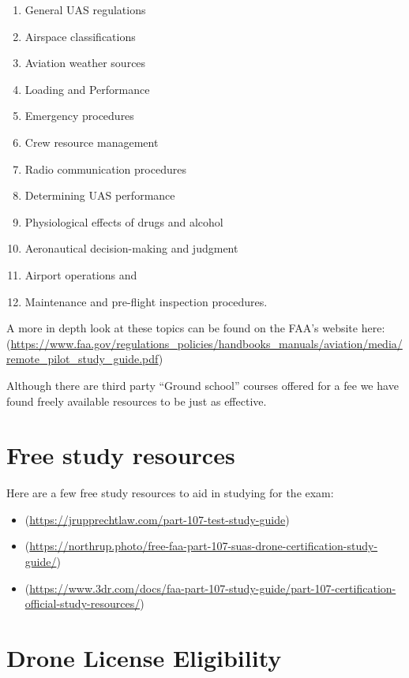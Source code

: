 \documentclass[
]{book}
\providecommand{\tightlist}{%
  \setlength{\itemsep}{0pt}\setlength{\parskip}{0pt}}
\begin{document}
\begin{enumerate}
\def\labelenumi{\arabic{enumi}.}
\tightlist
\item
  General UAS regulations
\item
  Airspace classifications
\item
  Aviation weather sources
\item
  Loading and Performance
\item
  Emergency procedures
\item
  Crew resource management
\item
  Radio communication procedures
\item
  Determining UAS performance
\item
  Physiological effects of drugs and alcohol
\item
  Aeronautical decision-making and judgment
\item
  Airport operations
  and
\item
  Maintenance and pre-flight inspection procedures.
\end{enumerate}

A more in depth look at these topics can be found on the FAA's website here: (\url{https://www.faa.gov/regulations_policies/handbooks_manuals/aviation/media/remote_pilot_study_guide.pdf})

Although there are third party ``Ground school'' courses offered for a fee we have found freely available resources to be just as effective.

\hypertarget{free-study-resources}{%
\section{Free study resources}\label{free-study-resources}}

Here are a few free study resources to aid in studying for the exam:

\begin{itemize}
\tightlist
\item
  (\url{https://jrupprechtlaw.com/part-107-test-study-guide})
\item
  (\url{https://northrup.photo/free-faa-part-107-suas-drone-certification-study-guide/})
\item
  (\url{https://www.3dr.com/docs/faa-part-107-study-guide/part-107-certification-official-study-resources/})
\end{itemize}

\hypertarget{drone-license-eligibility}{%
\section{Drone License Eligibility}\label{drone-license-eligibility}}
\end{document}

